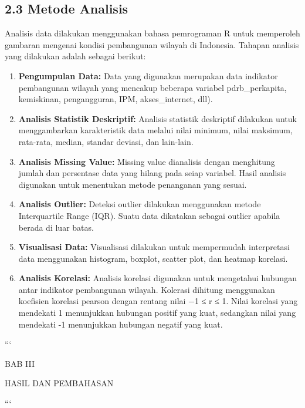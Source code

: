 \documentclass[
  12pt,
]{article}
\providecommand{\tightlist}{%
  \setlength{\itemsep}{0pt}\setlength{\parskip}{0pt}}
\begin{document}
\subsection{\texorpdfstring{\normalsize 2.3 \hspace {0,5cm} Metode
Analisis}{2.3  Metode Analisis}}\label{metode-analisis}

\vspace{-0.5cm}

Analisis data dilakukan menggunakan bahasa pemrograman R untuk
memperoleh gambaran mengenai kondisi pembangunan wilayah di Indonesia.
Tahapan analisis yang dilakukan adalah sebagai berikut:

\begin{enumerate}
\def\labelenumi{\arabic{enumi}.}
\tightlist
\item
  \textbf{Pengumpulan Data:} Data yang digunakan merupakan data
  indikator pembangunan wilayah yang mencakup beberapa variabel
  pdrb\_perkapita, kemiskinan, pengangguran, IPM, akses\_internet, dll).
\item
  \textbf{Analisis Statistik Deskriptif:} Analisis statistik deskriptif
  dilakukan untuk menggambarkan karakteristik data melalui nilai
  minimum, nilai maksimum, rata-rata, median, standar deviasi, dan
  lain-lain.
\item
  \textbf{Analisis Missing Value:} Missing value dianalisis dengan
  menghitung jumlah dan persentase data yang hilang pada seiap variabel.
  Hasil analisis digunakan untuk menentukan metode penanganan yang
  sesuai.
\item
  \textbf{Analisis Outlier:} Deteksi outlier dilakukan menggunakan
  metode Interquartile Range (IQR). Suatu data dikatakan sebagai outlier
  apabila berada di luar batas.
\item
  \textbf{Visualisasi Data:} Visualisasi dilakukan untuk mempermudah
  interpretasi data menggunakan histogram, boxplot, scatter plot, dan
  heatmap korelasi.
\item
  \textbf{Analisis Korelasi:} Analisis korelasi digunakan untuk
  mengetahui hubungan antar indikator pembangunan wilayah. Kolerasi
  dihitung menggunakan koefisien korelasi pearson dengan rentang nilai
  −1 ≤ r ≤ 1. Nilai korelasi yang mendekati 1 menunjukkan hubungan
  positif yang kuat, sedangkan nilai yang mendekati -1 menunjukkan
  hubungan negatif yang kuat.
\end{enumerate}

\setcounter{page}{2}
\newpage

\begin{center}
{
\bfseries

```
\vfill

\Large

BAB III

HASIL DAN PEMBAHASAN

```

}
\end{center}
\end{document}
